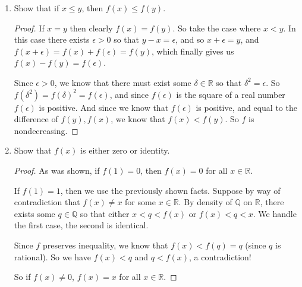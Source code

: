 \documentclass{article}
\begin{document}
\begin{enumerate}
\begin{enumerate}[label= (\alph*)]
            \item Show that if $x\leq y$, then $f(x)\leq f(y)$.
                \begin{proof} 
                    If $x=y$ then clearly $f(x)=f(y)$. So take the case where $x<y$. In this case
                    there exists $\epsilon>0$ so that $y-x=\epsilon$, and so $x+\epsilon=y$, and
                    $f(x+\epsilon)=f(x)+f(\epsilon)=f(y)$, which finally gives us 
                    $f(x)-f(y)=f(\epsilon)$.

                    Since $\epsilon>0$, we know that there must exist some $\delta\in \mathbb{R}$ so
                    that $\delta^2=\epsilon$. So $f(\delta^2)=f(\delta)^2=f(\epsilon)$, and
                    since $f(\epsilon)$ is the square of a real number $f(\epsilon)$ is positive.
                    And since we know that $f(\epsilon)$ is positive, and equal to the difference of
                    $f(y),f(x)$, we know that $f(x)<f(y)$. So $f$ is nondecreasing.
                \end{proof}
            \item Show that $f(x)$ is either zero or identity.
                \begin{proof} 
                    As was shown, if $f(1)=0$, then $f(x)=0$ for all $x\in \mathbb{R}$.

                    If $f(1)=1$, then we use the previously shown facts. Suppose by way of 
                    contradiction that $f(x)\neq x$ for some $x \in \mathbb{R}$.
                    By density of $\mathbb{Q}$ on $\mathbb{R}$, there
                    exists some $q\in \mathbb{Q}$ so that either $x<q<f(x)$ or $f(x)<q<x$.
                    We handle the first case, the second is identical.

                    Since $f$ preserves inequality, we know that $f(x)<f(q)=q$ 
                    (since $q$ is rational). So we have $f(x)<q$ and $q<f(x)$, a contradiction!

                    So if $f(x)\neq 0$, $f(x)=x$ for all $x\in \mathbb{R}$.
                \end{proof}
        \end{enumerate}

\end{enumerate}
\end{document}
